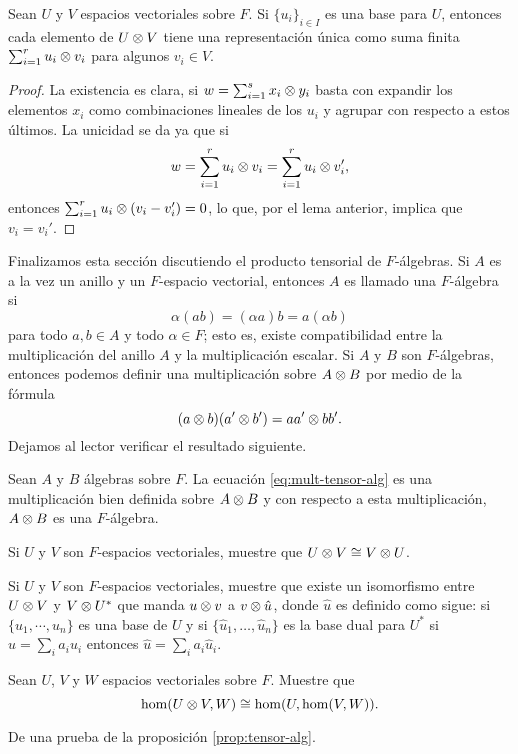 \begin{corollary}
  Sean $U$ y $V$ espacios vectoriales sobre $F$. Si $\{u_i\}_{i\in I}$ es una base para $U$, entonces cada elemento de $U \otimes V$ tiene una representación única como suma finita $\sum_{i=1}^r u_i \otimes v_i$ para algunos $v_i\in V$.
\end{corollary}
\begin{proof}
  La existencia es clara, si $w = \sum_{i=1}^s x_i \otimes y_i$ basta con expandir los elementos $x_i$ como combinaciones lineales de los $u_i$ y agrupar con respecto a estos últimos. La unicidad se da ya que si 
  \[
    w = \sum_{i=1}^r u_i \otimes v_i = \sum_{i=1}^r u_i \otimes v_i',
  \]
  entonces $\sum_{i=1}^r u_i \otimes (v_i-v_i') = 0$, lo que, por el lema anterior, implica que $v_i = v_i'$.
\end{proof}

Finalizamos esta sección discutiendo el producto tensorial de $F$-álgebras. Si $A$ es a la vez un anillo y un $F$-espacio vectorial, entonces $A$ es llamado una $F$-álgebra si 
\[
  \alpha (ab) = (\alpha a)b = a (\alpha b)
\]
para todo $a,b \in A$ y todo $\alpha \in F$; esto es, existe compatibilidad entre la multiplicación del anillo $A$ y la multiplicación escalar. Si $A$ y $B$ son $F$-álgebras, entonces podemos definir una multiplicación sobre $A \otimes B$ por medio de la fórmula
\begin{equation}
  (a \otimes b)(a' \otimes b') = aa' \otimes bb'. \label{eq:mult-tensor-alg}
\end{equation}
Dejamos al lector verificar el resultado siguiente.

\begin{proposition}\label{prop:tensor-alg}
  Sean $A$ y $B$ álgebras sobre $F$. La ecuación \eqref{eq:mult-tensor-alg} es una multiplicación bien definida sobre $A \otimes B$ y con respecto a esta multiplicación, $A\otimes B$ es una $F$-álgebra.
\end{proposition}




\ExerciseSection

\begin{ExerciseList}
  \item Si $U$ y $V$ son $F$-espacios vectoriales, muestre que $U \otimes V \cong V \otimes U$.
  
  \item Si $U$ y $V$ son $F$-espacios vectoriales, muestre que existe un isomorfismo entre $U \otimes V$ y $V \otimes U^*$ que manda $u \otimes v$ a $v \otimes \hat u$, donde $\hat u$ es definido como sigue: si $\{u_1,\cdots,u_n\}$ es una base de $U$ y si $\{\hat u_1,\ldots,\hat u_n\}$ es la base dual para $U^*$ si $u=\sum_i a_i u_i$ entonces $\hat u = \sum_i a_i \hat u_i$.
  
  \item Sean $U$, $V$ y $W$ espacios vectoriales sobre $F$. Muestre que
    \[
      \hom(U \otimes V, W) \cong \hom(U, \hom(V,W)).
    \]

  \item De una prueba de la proposición \ref{prop:tensor-alg}.
\end{ExerciseList}